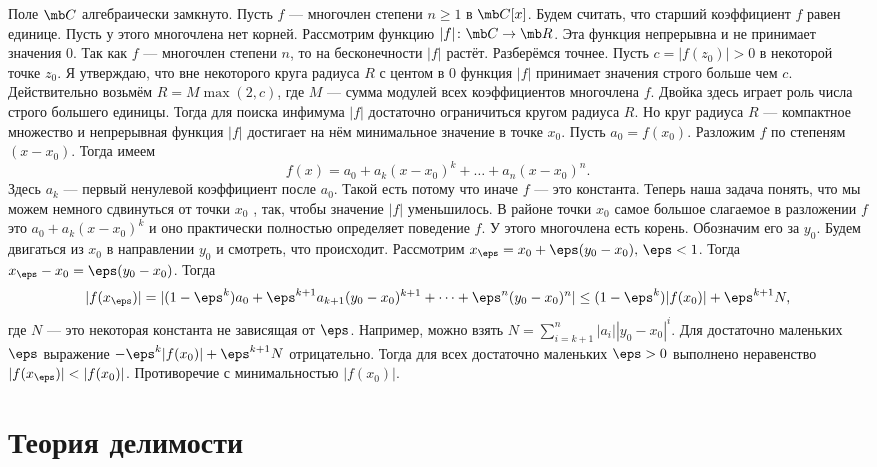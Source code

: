 \begin{thmm} Поле $\mb C$ алгебраически замкнуто.
\proof Пусть $f$ — многочлен степени $n\geq 1$ в $\mb C[x]$. Будем считать, что старший коэффициент $f$ равен единице. Пусть у этого многочлена нет корней. Рассмотрим функцию $|f|\colon \mb C \to \mb R$. Эта функция непрерывна и не принимает значения 0. Так как $f$ --- многочлен степени $n$, то на бесконечности $|f|$ растёт. Разберёмся точнее. Пусть
$c = |f(z_0)| > 0$ в некоторой точке $z_0$. Я утверждаю, что вне некоторого круга радиуса $R$ с центом в 0 функция
$|f|$ принимает значения строго больше чем $c$. Действительно возьмём $R= M \max(2,c)$, где $M$ --- сумма модулей всех коэффициентов многочлена $f$. Двойка здесь играет роль числа строго большего единицы.
Тогда для поиска инфимума $|f|$ достаточно ограничиться кругом радиуса $R$. Но круг радиуса $R$ --- компактное множество и непрерывная функция $|f|$ достигает на нём минимальное значение в точке $x_0$. Пусть $a_0 =f(x_0)$. Разложим
$f$ по степеням $(x-x_0)$. Тогда имеем
$$f(x) = a_0 + a_k (x-x_0)^k + \dots + a_n(x -x_0 )^n.$$
Здесь $a_k$ --- первый ненулевой коэффициент после $a_0$. Такой есть потому что иначе $f$ --- это константа. Теперь наша
задача понять, что мы можем немного сдвинуться от точки $x_0$ , так, чтобы значение $|f|$ уменьшилось. В районе точки
$x_0$ самое большое слагаемое в разложении $f$ это $a_0 + a_k (x-x_0)^k$ и оно практически полностью определяет поведение $f$.
У этого многочлена есть корень. Обозначим его за $y_0$. Будем двигаться из $x_0$ в направлении $y_0$ и смотреть, что происходит.
Рассмотрим $x_{\eps} = x_0 + \eps(y_0 -x_0 ), \,\eps < 1$. Тогда $x_{\eps} -x_0 = \eps(y_0 -x_0 )$. Тогда
$$|f(x_{\eps})| = |(1 - \eps^k)a_0 + \eps^{k+1} a_{k+1} (y_0 -x_0)^{k+1} + \dots+ \eps^n(y_0-x_0 )^n | \leq (1- \eps^k )|f(x_0)| + \eps^{k+1}N,$$
где $N$ — это некоторая константа не зависящая от $\eps$. Например, можно взять $N = \sum_{i=k+1}^n |a_i||y_0 -x_0 |^i$. Для достаточно
маленьких $\eps$ выражение $ -\eps^k |f(x_0)| + \eps^{k+1}N$ отрицательно. Тогда для всех достаточно маленьких $\eps>0$ выполнено неравенство $|f(x_{\eps})| < |f(x_0)|$.
Противоречие с минимальностью $|f(x_0)|$. \endproof
\end{thmm}





\chapter{Теория делимости}

